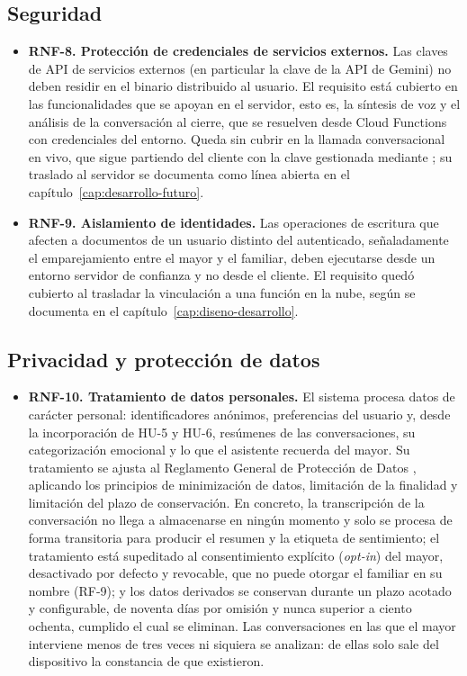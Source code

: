 \subsection*{Seguridad}
\begin{itemize}
    \item \textbf{RNF-8. Protección de credenciales de servicios externos.} Las claves de API de servicios
    externos (en particular la clave de la API de Gemini) no deben residir en el binario distribuido al
    usuario. El requisito está cubierto en las funcionalidades que se apoyan en el servidor, esto es, la
    síntesis de voz y el análisis de la conversación al cierre, que se resuelven desde Cloud Functions con
    credenciales del entorno. Queda sin cubrir en la llamada conversacional en vivo, que sigue partiendo del
    cliente con la clave gestionada mediante ; su traslado al servidor se documenta
    como línea abierta en el capítulo~\ref{cap:desarrollo-futuro}.
    \item \textbf{RNF-9. Aislamiento de identidades.} Las operaciones de escritura que afecten a documentos
    de un usuario distinto del autenticado, señaladamente el emparejamiento entre el mayor y el familiar,
    deben ejecutarse desde un entorno servidor de confianza y no desde el cliente. El requisito quedó
    cubierto al trasladar la vinculación a una función en la nube, según se documenta en el
    capítulo~\ref{cap:diseno-desarrollo}.
\end{itemize}

\subsection*{Privacidad y protección de datos}
\begin{itemize}
    \item \textbf{RNF-10. Tratamiento de datos personales.} El sistema procesa datos de carácter personal:
    identificadores anónimos, preferencias del usuario y, desde la incorporación de HU-5 y HU-6, resúmenes
    de las conversaciones, su categorización emocional y lo que el asistente recuerda del mayor. Su tratamiento se ajusta al Reglamento General de
    Protección de Datos \citep{RGPD2016}, aplicando los principios de minimización de datos, limitación de
    la finalidad y limitación del plazo de conservación. En concreto, la transcripción de la conversación no
    llega a almacenarse en ningún momento y solo se procesa de forma transitoria para producir el resumen y
    la etiqueta de sentimiento; el tratamiento está supeditado al consentimiento explícito
    (\textit{opt-in}) del mayor, desactivado por defecto y revocable, que no puede otorgar el familiar en
    su nombre (RF-9); y los datos derivados se conservan durante un plazo acotado y configurable, de
    noventa días por omisión y nunca superior a ciento ochenta, cumplido el cual se eliminan. Las
    conversaciones en las que el mayor interviene menos de tres veces ni siquiera se analizan: de ellas solo
    sale del dispositivo la constancia de que existieron.
\end{itemize}

